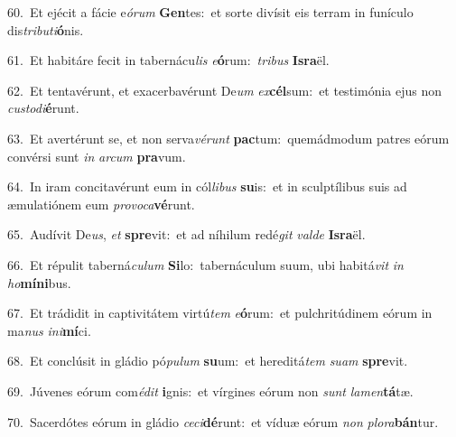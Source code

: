 {\numbfont\textcolor{\numbcolor}{60.}}~Et ejécit a fácie e\-\textit{ó}\-\textit{rum} \textbf{Gen}\-tes:~\star et sorte divísit eis terram in funículo dis\-\textit{tri}\-\textit{bu}\textit{ti}\textbf{ó}nis.\par
{\numbfont\textcolor{\numbcolor}{61.}}~Et habitáre fecit in tabernácu\textit{lis} \textit{e}\-\textbf{ó}rum:~\star \textit{tri}\-\textit{bus} \textbf{Is}\-\textbf{ra}ël.\par
{\numbfont\textcolor{\numbcolor}{62.}}~Et tentavérunt, et exacerbavérunt De\textit{um} \textit{ex}\-\textbf{cél}sum:~\star et testimónia ejus non \textit{cus}\-\textit{to}\textit{di}\textbf{é}runt.\par
{\numbfont\textcolor{\numbcolor}{63.}}~Et avertérunt se, et non serva\-\textit{vé}\-\textit{runt} \textbf{pac}\-tum:~\star quemádmodum patres eórum convérsi sunt \textit{in} \textit{ar}\-\textit{cum} \textbf{pra}\-vum.\par
{\numbfont\textcolor{\numbcolor}{64.}}~In iram concitavérunt eum in cól\-\textit{li}\-\textit{bus} \textbf{su}\-is:~\star et in sculptílibus suis ad æmulatiónem eum \textit{pro}\-\textit{vo}\textit{ca}\textbf{vé}runt.\par
{\numbfont\textcolor{\numbcolor}{65.}}~Audívit De\-\textit{us}\-, \textit{et} \textbf{spre}\-vit:~\star et ad níhilum redé\textit{git} \textit{val}\-\textit{de} \textbf{Is}\-\textbf{ra}ël.\par
{\numbfont\textcolor{\numbcolor}{66.}}~Et répulit taberná\-\textit{cu}\-\textit{lum} \textbf{Si}\-lo:~\star tabernáculum suum, ubi habitá\textit{vit} \textit{in} \textit{ho}\-\textbf{mí}\textbf{ni}bus.\par
{\numbfont\textcolor{\numbcolor}{67.}}~Et trádidit in captivitátem virtú\textit{tem} \textit{e}\-\textbf{ó}rum:~\star et pulchritúdinem eórum in ma\textit{nus} \textit{in}\-\textit{i}\textbf{mí}ci.\par
{\numbfont\textcolor{\numbcolor}{68.}}~Et conclúsit in gládio pó\-\textit{pu}\-\textit{lum} \textbf{su}\-um:~\star et hereditá\textit{tem} \textit{su}\-\textit{am} \textbf{spre}\-vit.\par
{\numbfont\textcolor{\numbcolor}{69.}}~Júvenes eórum com\-\textit{é}\-\textit{dit} \textbf{i}\-gnis:~\star et vírgines eórum non \textit{sunt} \textit{la}\-\textit{men}\textbf{tá}tæ.\par
{\numbfont\textcolor{\numbcolor}{70.}}~Sacerdótes eórum in gládio \textit{ce}\-\textit{ci}\textbf{dé}runt:~\star et víduæ eórum \textit{non} \textit{plo}\-\textit{ra}\textbf{bán}tur.\par
